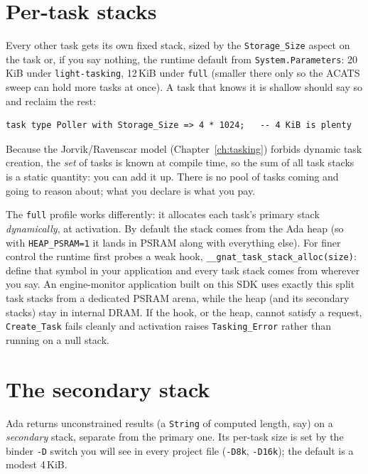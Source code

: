 \section{Per-task stacks}

Every other task gets its own fixed stack, sized by the \texttt{Storage\_Size}
aspect on the task or, if you say nothing, the runtime default from
\texttt{System.Parameters}: 20\,KiB under \texttt{light-tasking}, 12\,KiB under
\texttt{full} (smaller there only so the ACATS sweep can hold more tasks at once).
A task that knows it is shallow should say so and reclaim the rest:

\begin{lstlisting}
task type Poller with Storage_Size => 4 * 1024;   -- 4 KiB is plenty
\end{lstlisting}

Because the Jorvik/Ravenscar model (Chapter~\ref{ch:tasking}) forbids dynamic task
creation, the \emph{set} of tasks is known at compile time, so the sum of all task
stacks is a static quantity: you can add it up. There is no pool of tasks coming
and going to reason about; what you declare is what you pay.

The \texttt{full} profile works differently: it allocates each task's primary
stack \emph{dynamically}, at activation.
 By default the stack comes from the Ada
heap (so with \texttt{HEAP\_PSRAM=1} it lands in PSRAM along with everything
else). For finer control the runtime first probes a weak hook,
\texttt{\_\_gnat\_task\_stack\_alloc(size)}: define that symbol in your
application and every task stack comes from wherever you say. An
engine-monitor application built on this SDK uses exactly this split
\textemdash{} task stacks from a dedicated PSRAM arena, while the heap (and
its secondary stacks) stay in internal DRAM. If the hook, or the heap, cannot
satisfy a request, \texttt{Create\_Task} fails cleanly and activation raises
\texttt{Tasking\_Error} rather than running on a null stack.

\section{The secondary stack}

Ada returns unconstrained results (a \texttt{String} of computed length, say)
on a \emph{secondary} stack, separate from the primary one. Its per-task size is set
by the binder \texttt{-D} switch you will see in every project file
(\texttt{-D8k}, \texttt{-D16k}); the default is a modest 4\,KiB.


